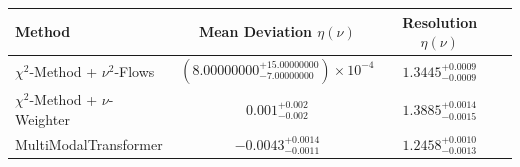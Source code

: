     \begin{tabular}{lccc}
        \toprule
        Method & Mean Deviation $\eta({\nu})$ & Resolution $\eta({\nu})$ \\
        \midrule
        $\chi^2$-Method + $\nu^2$-Flows & $(8.00000000^{+15.00000000}_{-7.00000000})\times 10^{-4}$ & $1.3445^{+0.0009}_{-0.0009}$ \\
        $\chi^2$-Method + $\nu$-Weighter & $0.001^{+0.002}_{-0.002}$ & $1.3885^{+0.0014}_{-0.0015}$ \\
        MultiModalTransformer & $-0.0043^{+0.0014}_{-0.0011}$ & $1.2458^{+0.0010}_{-0.0013}$ \\
        \bottomrule
    \end{tabular}